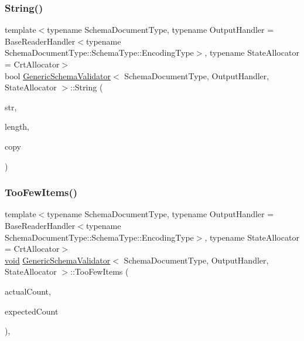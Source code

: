\subsubsection{\texorpdfstring{String()}{String()}}
{\footnotesize\ttfamily template$<$typename Schema\+Document\+Type, typename Output\+Handler = Base\+Reader\+Handler$<$typename Schema\+Document\+Type\+::\+Schema\+Type\+::\+Encoding\+Type$>$, typename State\+Allocator = Crt\+Allocator$>$ \\
bool \hyperlink{classGenericSchemaValidator}{Generic\+Schema\+Validator}$<$ Schema\+Document\+Type, Output\+Handler, State\+Allocator $>$\+::String (\begin{DoxyParamCaption}\item[{const \hyperlink{classGenericSchemaValidator_a8b7dab5a0cda9cc0adaefb4401d260c1}{Ch} $\ast$}]{str,  }\item[{\hyperlink{rapidjson_8h_a5ed6e6e67250fadbd041127e6386dcb5}{Size\+Type}}]{length,  }\item[{bool}]{copy }\end{DoxyParamCaption})\hspace{0.3cm}{\ttfamily [inline]}}

\mbox{\label{classGenericSchemaValidator_af39007d9bf43126dab231961a1c5064f}} 
\subsubsection{\texorpdfstring{Too\+Few\+Items()}{TooFewItems()}}
{\footnotesize\ttfamily template$<$typename Schema\+Document\+Type, typename Output\+Handler = Base\+Reader\+Handler$<$typename Schema\+Document\+Type\+::\+Schema\+Type\+::\+Encoding\+Type$>$, typename State\+Allocator = Crt\+Allocator$>$ \\
\hyperlink{imgui__impl__opengl3__loader_8h_ac668e7cffd9e2e9cfee428b9b2f34fa7}{void} \hyperlink{classGenericSchemaValidator}{Generic\+Schema\+Validator}$<$ Schema\+Document\+Type, Output\+Handler, State\+Allocator $>$\+::Too\+Few\+Items (\begin{DoxyParamCaption}\item[{\hyperlink{rapidjson_8h_a5ed6e6e67250fadbd041127e6386dcb5}{Size\+Type}}]{actual\+Count,  }\item[{\hyperlink{rapidjson_8h_a5ed6e6e67250fadbd041127e6386dcb5}{Size\+Type}}]{expected\+Count }\end{DoxyParamCaption})\hspace{0.3cm}{\ttfamily [inline]}, {\ttfamily [virtual]}}



